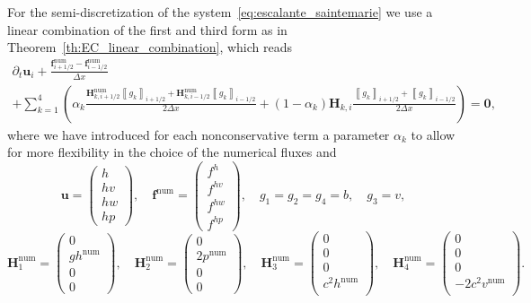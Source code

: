 \documentclass[]{scrartcl}
\renewcommand{\vec}[1]{\boldsymbol{#1}}
\newcommand{\jump}[1]{\left\llbracket #1  \right\rrbracket}
\theoremstyle{definition}
\begin{document}
For the semi-discretization of the system~\eqref{eq:escalante_saintemarie} we use a linear combination of the first and third form as in Theorem~\ref{th:EC_linear_combination}, which reads
\begin{multline}
    \partial_t \vec{u}_i
    + \frac{\vec{f}^{\mathrm{num}}_{i+1/2} - \vec{f}^{\mathrm{num}}_{i-1/2}}{\Delta x}
    \\
    + \sum_{k=1}^4 \left ( \alpha_k \frac{\vec{H}^{\mathrm{num}}_{k,i+1/2}\jump{g_k}_{i+1/2} + \vec{H}^{\mathrm{num}}_{k,i-1/2}\jump{g_k}_{i-1/2}}{2 \Delta x} + (1-\alpha_k) \vec{H}_{k,i} \frac{{\jump{g_k}_{i+1/2} + \jump{g_k}_{i-1/2}}}{2 \Delta x} \right )
    = \vec{0},
\label{saintmarie_semi}
\end{multline}
where we have introduced for each nonconservative term a parameter $\alpha_k$ to allow for more flexibility in the choice of the numerical fluxes and
\begin{equation}
\vec{u} =
\begin{pmatrix}
h \\
hv \\
hw \\
hp
\end{pmatrix},
\quad
\vec{f}^{\mathrm{num}} =
\begin{pmatrix}
f^{h} \\
f^{hv} \\
f^{hw} \\
f^{hp}
\end{pmatrix},
\quad
g_1 = g_2 = g_4 = b, \quad g_3 = v,
\label{saintmarie_noncons_fluxes}
\end{equation}
\begin{equation}
\vec{H}^{\mathrm{num}}_1 =
\begin{pmatrix}
0  \\
gh^{\mathrm{num}} \\
0 \\
0
\end{pmatrix},
\quad
\vec{H}^{\mathrm{num}}_2 =
\begin{pmatrix}
0  \\
2p^{\mathrm{num}} \\
0 \\
0
\end{pmatrix},
\quad
\vec{H}^{\mathrm{num}}_3 =
\begin{pmatrix}
0  \\
0 \\
0 \\
c^2 h^{\mathrm{num}} \\
\end{pmatrix},
\quad
\vec{H}^{\mathrm{num}}_4 =
\begin{pmatrix}
0  \\
0 \\
0 \\
-2c^2 v^{\mathrm{num}} \\
\end{pmatrix}.
\end{equation}
\end{document}

